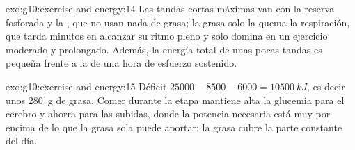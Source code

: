 \begin{solution}{exo:g10:exercise-and-energy:14}
Las tandas cortas máximas van con la reserva fosforada y la
, que no usan nada de grasa; la grasa solo la quema la
respiración, que tarda minutos en alcanzar su ritmo pleno y solo domina
en un ejercicio moderado y prolongado. Además, la energía total de unas
pocas tandas es pequeña frente a la de una hora de esfuerzo sostenido.
\end{solution}

\begin{solution}{exo:g10:exercise-and-energy:15}
Déficit $25000 - 8500 - 6000 = \qty{10500}{kJ}$, es decir unos
\qty{280}{g} de grasa. Comer durante la etapa mantiene alta la glucemia
para el cerebro y ahorra  para las subidas, donde la potencia
necesaria está muy por encima de lo que la grasa sola puede aportar; la
grasa cubre la parte constante del día.
\end{solution}

